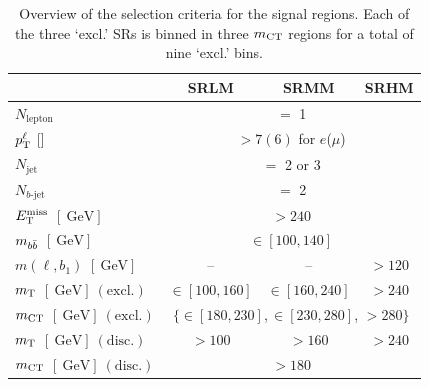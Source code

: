 \begin{table}
	\begin{center}
		\begin{tabular} {l | c c c }
			\toprule
				&  \textbf{SRLM} & \textbf{SRMM} & \textbf{SRHM} \\
			\midrule
			$N_{\mathrm{lepton}}$ & \multicolumn{3}{c}{$=$ 1}\\
			$p^\ell_{\textrm{T}}$ [\GeV] & \multicolumn{3}{c}{ $>7(6)$ for $e$($\mu$)} \\
			$N_\mathrm{jet}$ & \multicolumn{3}{c}{$=$ 2 or 3}\\
			$N_{b\textrm{-jet}}$ &\multicolumn{3}{c}{$=$ 2} \\
			$E_{\textrm{T}}^{\textrm{miss}}$ $[\SI{}{\GeV}]$ & \multicolumn{3}{c}{$>240$}\\
			$m_{b\bar{b}}$  $[\SI{}{\GeV}]$ & \multicolumn{3}{c}{$\in [100,140]$}\\
			$m(\ell,b_1)$ $[\SI{}{\GeV}]$ & -- & -- & $>120$ \\
			\midrule
			$m_{\textrm{T}}$ $[\SI{}{\GeV}]~\mathrm{(excl.)}$&   $\in [100,160]$ & $\in [160,240]$ & $>240$ \\
			
			
			$m_{\textrm{CT}}$ $[\SI{}{\GeV}]~\mathrm{(excl.)}$ &\multicolumn{3}{c}{ $ \{ \in [180,230]$,\,$\in [230,280]$, $>280  \}$}\\
			
			\midrule
			$m_{\textrm{T}}$ $[\SI{}{\GeV}]~\mathrm{(disc.)}$&   $>100$ & $>160$ & $>240$ \\
			$m_{\textrm{CT}}$ $[\SI{}{\GeV}]~\mathrm{(disc.)}$ & \multicolumn{3}{c}{ $>180$}\\
			\bottomrule
		\end{tabular}
		\caption{Overview of the selection criteria for the signal regions. Each of the three `excl.' SRs is binned in three $m_{\textrm{CT}}$ regions for a total of nine `excl.'  bins.} 
		\label{tab:SignalRegionDef}
	\end{center}
\end{table}


